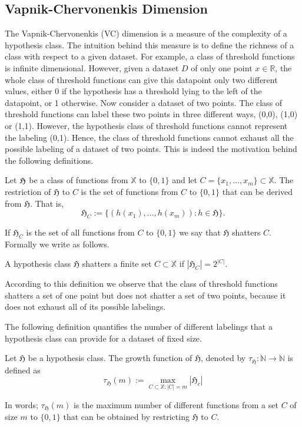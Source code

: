 \subsection{Vapnik-Chervonenkis Dimension}
The Vapnik-Chervonenkis (VC) dimension is a measure of the complexity of a
hypothesis class. The intuition behind this measure is to define the richness of
a class with respect to a given dataset. For example, a class of threshold
functions is infinite dimensional. However, given a dataset $D$ of only one
point $x \in \mathbb{R}$, the whole class of threshold functions can give this
datapoint only two
different values, either 0 if the hypothesis has a threshold lying to the
left of the datapoint, or 1 otherwise. Now consider a dataset
of two points. The class of threshold functions can label these two points in three
different ways, (0,0), (1,0) or (1,1). However, the hypothesis class of threshold
functions cannot represent the labeling (0,1). Hence, the class of threshold
functions cannot exhaust all the possible labeling of a dataset of two
points. This is indeed the motivation behind the following definitions.

\begin{definition}
	Let $\frak{H}$ be a class of functions from $\mathbb{X}$ to $\{0,1\}$
	and let $C = \{x_1, \dots, x_m\} \subset \mathbb{X}$. The restriction of
	$\mathfrak{H}$
	to $C$ is the set of functions from $C$ to $\{0,1\}$ that can be derived from
	$\mathfrak{H}$. That is, 
	$$
	\mathfrak{H}_C := \{(h(x_1), \dots, h(x_m)): h \in \mathfrak{H}\}.
	$$	
	 \end{definition}
	 If $\mathfrak{H}_C$ is the set of all functions from $C$ to $\{0,1\}$
	 we say that $\mathfrak{H}$ shatters $C$. Formally we write as follows.
	 \begin{definition}[Shattering]
		A hypothesis class $\mathfrak{H}$ shatters a finite set $C \subset
		\mathbb{X}$
		if $|\mathfrak{H}_C|= 2^{|C|}$.
	 \end{definition}
	 According to this definition we observe that the class of threshold
	 functions shatters a set of one point but does not shatter a set of two
	 points, because it does not exhaust all of its possible labelings.

	 The following definition quantifies the number of different labelings that a
	 hypothesis class can provide for a dataset of fixed size.
	 \begin{definition}
		Let $\mathfrak{H}$ be a hypothesis class. The growth function of
		$\mathfrak{H}$, denoted by $\tau_\mathfrak{H} :\mathbb{N} \to \mathbb{N}$ is defined as 
		$$
		\tau_\mathfrak{H}(m) := \max_{C \subset \mathbb{X}: |C|=m}|\mathfrak{H}_c|
		$$
	\end{definition} 
	In words; $\tau_\mathfrak{H}(m)$ is the maximum number of different functions
	from a set $C$ of size $m$ to $\{0,1\}$ that can be obtained
	by restricting $\mathfrak{H}$ to $C$.

